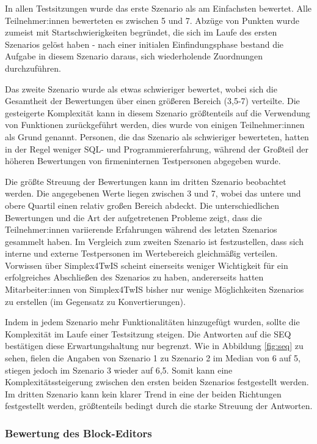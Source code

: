 In allen Testsitzungen wurde das erste Szenario als am Einfachsten bewertet. Alle Teilnehmer:innen bewerteten es zwischen 5 und 7. Abzüge von Punkten wurde zumeist mit Startschwierigkeiten begründet, die sich im Laufe des ersten Szenarios gelöst haben - nach einer initialen Einfindungsphase bestand die Aufgabe in diesem Szenario daraus, sich wiederholende Zuordnungen durchzuführen.

Das zweite Szenario wurde als etwas schwieriger bewertet, wobei sich die Gesamtheit der Bewertungen über einen größeren Bereich (3,5-7) verteilte. Die gesteigerte Komplexität kann in diesem Szenario größtenteils auf die Verwendung von Funktionen zurückgeführt werden, dies wurde von einigen Teilnehmer:innen als Grund genannt. Personen, die das Szenario als schwieriger bewerteten, hatten in der Regel weniger \ac{SQL}- und Programmiererfahrung, während der Großteil der höheren Bewertungen von firmeninternen Testpersonen abgegeben wurde.

Die größte Streuung der Bewertungen kann im dritten Szenario beobachtet werden. Die angegebenen Werte liegen zwischen 3 und 7, wobei das untere und obere Quartil einen relativ großen Bereich abdeckt. Die unterschiedlichen Bewertungen und die Art der aufgetretenen Probleme zeigt, dass die Teilnehmer:innen variierende Erfahrungen während des letzten Szenarios gesammelt haben. Im Vergleich zum zweiten Szenario ist festzustellen, dass sich interne und externe Testpersonen im Wertebereich gleichmäßig verteilen. Vorwissen über Simplex4TwIS scheint einerseits weniger Wichtigkeit für ein erfolgreiches Abschließen des Szenarios zu haben, andererseits hatten Mitarbeiter:innen von Simplex4TwIS bisher nur wenige Möglichkeiten Szenarios zu erstellen (im Gegensatz zu Konvertierungen).

Indem in jedem Szenario mehr Funktionalitäten hinzugefügt wurden, sollte die Komplexität im Laufe einer Testsitzung steigen. Die Antworten auf die \ac{SEQ} bestätigen diese Erwartungshaltung nur begrenzt. Wie in Abbildung \ref{fig:seq} zu sehen, fielen die Angaben von Szenario 1 zu Szenario 2 im Median von 6 auf 5, stiegen jedoch im Szenario 3 wieder auf 6,5. Somit kann eine Komplexitätssteigerung zwischen den ersten beiden Szenarios festgestellt werden. Im dritten Szenario kann kein klarer Trend in eine der beiden Richtungen festgestellt werden, größtenteils bedingt durch die starke Streuung der Antworten.

\subsubsection{Bewertung des Block-Editors}

